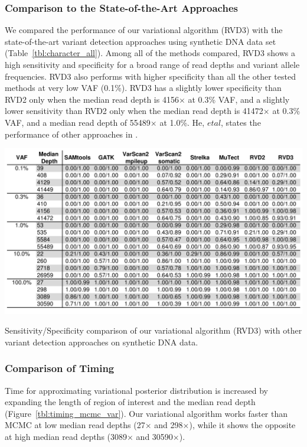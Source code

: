 \documentclass[11pt,reqno]{amsart}
\begin{document}
\subsubsection{Comparison to the State-of-the-Art Approaches}
We compared the performance of our variational algorithm (RVD3) with the state-of-the-art variant detection approaches using synthetic DNA data set (Table~\ref{tbl:character_all}).
Among all of the methods compared, RVD3 shows a high sensitivity and specificity for a broad range of read depths and variant allele frequencies.
RVD3 also performs with higher specificity than all the other tested methods at very low VAF (0.1\%).
RVD3 has a slightly lower specificity than RVD2 only when the median read depth is 4156$\times$ at 0.3\% VAF, and a slightly lower sensitivity than RVD2 only when the median read depth is 41472$\times$ at 0.3\% VAF, and a median read depth of 55489$\times$ at 1.0\%.
He, $\mathit{et} \mathit{al}$, states the performance of other approaches in \citep{he2015rvd2}.

\begin{table}[htbp]
\centering
\includegraphics[width=1.0\textwidth]{tables/character_all.png}
\caption{Sensitivity/Specificity comparison of our variational algorithm (RVD3) with other variant detection approaches on synthetic DNA data.}
\vspace{-5pt}
\label{tbl:character_all}
\end{table}

\subsubsection{Comparison of Timing}
Time for approximating variational posterior distribution is increased by expanding the length of region of interest and the median read depth (Figure~\ref{tbl:timing_mcmc_var}).
Our variational algorithm works faster than MCMC at low median read depths (27$\times$ and 298$\times$), while it shows the opposite at high median read depths (3089$\times$ and 30590$\times$).
\end{document}
